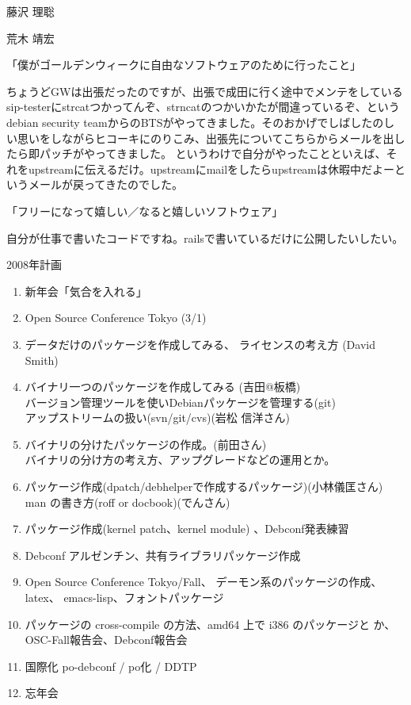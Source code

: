 \documentclass[cjk,dvipdfmx,12pt]{beamer}
\begin{document}
\begin{frame}{藤沢 理聡}
\end{frame}\begin{frame}{荒木 靖宏}

「僕がゴールデンウィークに自由なソフトウェアのために行ったこと」

ちょうどGWは出張だったのですが、出張で成田に行く途中でメンテをしているsip-testerにstrcatつかってんぞ、strncatのつかいかたが間違っているぞ、というdebian
security teamからのBTSがやってきました。そのおかげでしばしたのしい思いをしながらヒコーキにのりこみ、出張先についてこちらからメールを出したら即パッチがやってきました。
というわけで自分がやったことといえば、それをupstreamに伝えるだけ。upstreamにmailをしたらupstreamは休暇中だよーというメールが戻ってきたのでした。

「フリーになって嬉しい／なると嬉しいソフトウェア」

自分が仕事で書いたコードですね。railsで書いているだけに公開したいしたい。

\end{frame}


\begin{frame}{2008年計画}

{\scriptsize
\begin{enumerate}
 \item 新年会「気合を入れる」
 \item Open Source Conference Tokyo (3/1)
 \item データだけのパッケージを作成してみる、
       ライセンスの考え方 (David Smith)
 \item バイナリ一つのパッケージを作成してみる (吉田@板橋)\\
       バージョン管理ツールを使いDebianパッケージを管理する(git)\\
       アップストリームの扱い(svn/git/cvs)(岩松 信洋さん)
 \item バイナリの分けたパッケージの作成。(前田さん)\\
       バイナリの分け方の考え方、アップグレードなどの運用とか。
 \item パッケージ作成(dpatch/debhelperで作成するパッケージ)(小林儀匡さん)\\
       man の書き方(roff or docbook)(でんさん)
 \item パッケージ作成(kernel patch、kernel module)
       、Debconf発表練習
 \item Debconf アルゼンチン、共有ライブラリパッケージ作成

 \item Open Source Conference Tokyo/Fall、
       デーモン系のパッケージの作成、latex、 emacs-lisp、フォントパッケージ
 \item パッケージの cross-compile の方法、amd64 上で i386 のパッケージと
       か、OSC-Fall報告会、Debconf報告会
 \item 国際化 po-debconf / po化 / DDTP
 \item 忘年会
\end{enumerate}
}
\end{frame}
\end{document}

